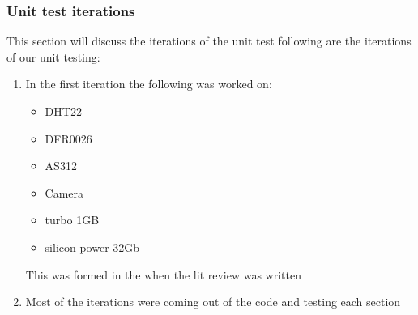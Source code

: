 \subsubsection{Unit test iterations}
This section will discuss the iterations of the unit test following are the iterations of  our unit testing:
\begin{enumerate}
    \item In the first iteration  the following was worked on:
    \begin{itemize}
        \item DHT22
        \item DFR0026
        \item AS312
        \item Camera
        \item turbo 1GB
        \item silicon power 32Gb
    \end{itemize}

    This was formed in the when the lit review was written
    \item Most of the iterations were coming out of the code and testing  each section 
\end{enumerate}
